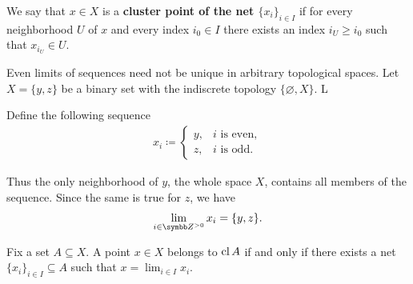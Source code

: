 \begin{definition}\label{def:net_cluster_point}\cite[50]{Engelking1989}
  We say that \( x \in X \) is a \textbf{cluster point of the net \( \{ x_i \}_{i \in I} \)} if for every neighborhood \( U \) of \( x \) and every index \( i_0 \in I \) there exists an index \( i_U \geq i_0 \) such that \( x_{i_U} \in U \).
\end{definition}

\begin{example}\label{ex:multiple_limit_points_of_net}
  Even limits of sequences need not be unique in arbitrary topological spaces. Let \( X = \{ y, z \} \) be a binary set with the indiscrete topology \( \{ \varnothing, X \} \). L

  Define the following sequence
  \begin{align*}
    x_i \coloneqq \begin{cases}
      y, &i \text{ is even}, \\
      z, &i \text{ is odd}.
    \end{cases}
  \end{align*}

  Thus the only neighborhood of \( y \), the whole space \( X \), contains all members of the sequence. Since the same is true for \( z \), we have
  \begin{align*}
    \lim_{i \in \BB{Z}^{>0}} x_i = \{ y, z \}.
  \end{align*}
\end{example}

\begin{proposition}\label{thm:limit_point_iff_in_closure}\cite[proposition 1.6.3]{Engelking1989}
  Fix a set \( A \subseteq X \). A point \( x \in X \) belongs to \( \operatorname{cl}{A} \) if and only if there exists a net \( \{ x_i \}_{i \in I} \subseteq A \) such that \( x = \lim_{i \in I} x_i \).
\end{proposition}
